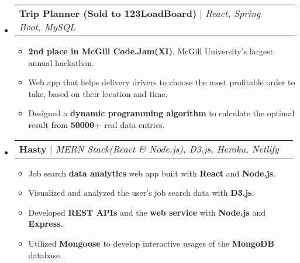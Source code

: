 \documentclass[letterpaper,11pt]{article}
\makeatletter
\newcommand{\resumeItem}[1]{
  \item\small{
    {#1 \vspace{-2pt}}
  }
}
\newcommand{\resumeProjectHeading}[2]{
    \item
    \begin{tabular*}{0.97\textwidth}{l@{\extracolsep{\fill}}r}
      \small#1 & #2 \\
    \end{tabular*}\vspace{-7pt}
}
\newcommand{\resumeSubHeadingListStart}{\begin{itemize}[leftmargin=0.15in, label={}]}
\newcommand{\resumeSubHeadingListEnd}{\end{itemize}}
\newcommand{\resumeItemListStart}{\begin{itemize}}
\newcommand{\resumeItemListEnd}{\end{itemize}\vspace{-5pt}}
\makeatother
\begin{document}
    \resumeSubHeadingListStart
    \resumeProjectHeading
          {\textbf{Trip Planner (Sold to 123LoadBoard)} $|$ \emph{React, Spring Boot, MySQL}}{\href{}{}}
          \resumeItemListStart
            \resumeItem{\textbf{2nd place in McGill Code.Jam(XI)}, McGill University's largest annual hackathon.}
            \resumeItem{Web app that helps delivery drivers to choose the most profitable order to take, based on their location and time.}
            \resumeItem{Designed a \textbf{dynamic programming algorithm} to calculate the optimal result from \textbf{50000+} real data entries.} 
          \resumeItemListEnd
      \resumeProjectHeading
          {\textbf{Hasty} $|$ \emph{MERN Stack(React \& Node.js), D3.js, Heroku, Netlify} }
          {\href{}{}}
          \resumeItemListStart
            \resumeItem{Job search \textbf{data analytics} web app built with \textbf{React} and \textbf{Node.js}.}
            \resumeItem{Visualized and analyzed the user's job search data with \textbf{D3.js}.}
            \resumeItem{Developed \textbf{REST APIs} and the \textbf{web service} with \textbf{Node.js} and \textbf{Express}.}
            \resumeItem{Utilized \textbf{Mongoose} to develop interactive usages of the \textbf{MongoDB} database.}
          \resumeItemListEnd
        
   
          
    \resumeSubHeadingListEnd
\end{document}
